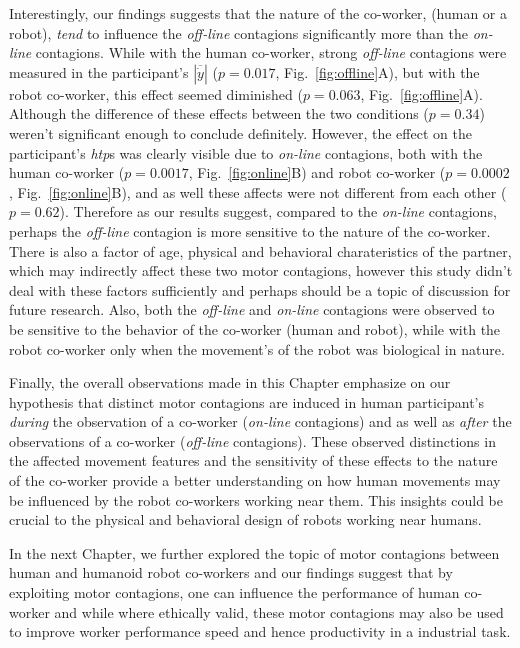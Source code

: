 Interestingly, our findings suggests that the nature of the co-worker, (human or a robot), \textit{tend} to influence the \textit{off-line} contagions significantly more than the \textit{on-line} contagions. While with the human co-worker, strong \textit{off-line} contagions were measured in the participant's $|\overline{\dot{y}}|$ ($p = 0.017$, Fig.~\ref{fig:offline}A), but with the robot co-worker, this effect seemed diminished ($p = 0.063$, Fig.~\ref{fig:offline}A). Although the difference of these effects between the two conditions ($p = 0.34$) weren't significant enough to conclude definitely. However, the effect on the participant's {\it htp}s was clearly visible due to \textit{on-line} contagions, both with the human co-worker ($p = 0.0017$, Fig.~\ref{fig:online}B) and robot co-worker ($p = 0.0002$, Fig.~\ref{fig:online}B), and as well these affects were not different from each other ($p = 0.62$). Therefore as our results suggest, compared to the \textit{on-line} contagions, perhaps the \textit{off-line} contagion is more sensitive to the nature of the co-worker. There is also a factor of age, physical and behavioral charateristics of the partner, which may indirectly affect these two motor contagions, however this study didn't deal with these factors sufficiently and perhaps should be a topic of discussion for future research. Also, both the \textit{off-line} and \textit{on-line} contagions were observed to be sensitive to the behavior of the co-worker (human and robot), while with the robot co-worker only when the movement's of the robot was biological in nature. 

Finally, the overall observations made in this Chapter emphasize on our hypothesis that distinct motor contagions are induced in human participant's \emph{during} the observation of a co-worker (\textit{on-line} contagions) and as well as \emph{after} the observations of a co-worker (\textit{off-line} contagions). These observed distinctions in the affected movement features and the sensitivity of these effects to the nature of the co-worker provide a better understanding on how human movements may be influenced by the robot co-workers working near them. This insights could be crucial to the physical and behavioral design of robots working near humans.


In the next Chapter, we further explored the topic of motor contagions between human and humanoid robot co-workers and our findings suggest that by exploiting motor contagions, one can influence the performance of human co-worker and while where ethically valid, these motor contagions may also be used to improve worker performance speed and hence productivity in a industrial task.

\clearpage